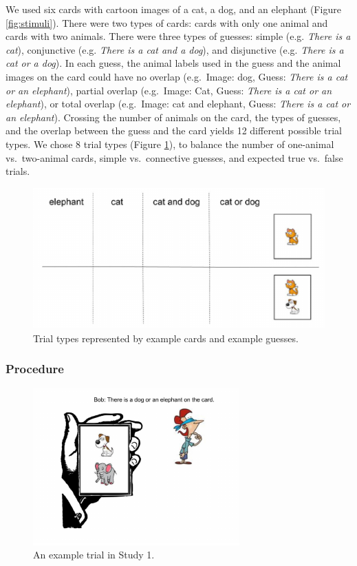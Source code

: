 \documentclass[floatsintext,man]{apa6}
\theoremstyle{definition}
\theoremstyle{definition}
\theoremstyle{definition}
\theoremstyle{remark}
\begin{document}
We used six cards with cartoon images of a cat, a dog, and an elephant
(Figure \ref{fig:stimuli}). There were two types of cards: cards with
only one animal and cards with two animals. There were three types of
guesses: simple (e.g. \emph{There is a cat}), conjunctive (e.g.
\emph{There is a cat and a dog}), and disjunctive (e.g. \emph{There is a
cat or a dog}). In each guess, the animal labels used in the guess and
the animal images on the card could have no overlap (e.g.~Image: dog,
Guess: \emph{There is a cat or an elephant}), partial overlap
(e.g.~Image: Cat, Guess: \emph{There is a cat or an elephant}), or total
overlap (e.g.~Image: cat and elephant, Guess: \emph{There is a cat or an
elephant}). Crossing the number of animals on the card, the types of
guesses, and the overlap between the guess and the card yields 12
different possible trial types. We chose 8 trial types (Figure
\ref{fig:trials}), to balance the number of one-animal vs.~two-animal
cards, simple vs.~connective guesses, and expected true vs.~false
trials.

\begin{figure}[!h]

{\centering \includegraphics{figs/trials-1} 

}

\caption{Trial types represented by example cards and example guesses.}\label{fig:trials}
\end{figure}

\subsubsection{Procedure}\label{procedure}

\begin{figure}[!h]

{\centering \includegraphics{figs/exampleTrial-1} 

}

\caption{An example trial in Study 1.}\label{fig:exampleTrial}
\end{figure}
\end{document}
